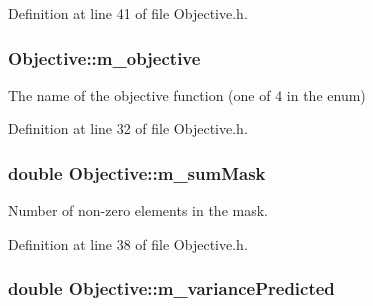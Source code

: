 Definition at line 41 of file Objective.\+h.

\subsubsection[{\texorpdfstring{m\+\_\+objective}{m_objective}}]{ Objective\+::m\+\_\+objective\hspace{0.3cm}{\ttfamily [private]}}\hypertarget{classObjective_a51987f37a05068aba28866a967eb4e67}{}\label{classObjective_a51987f37a05068aba28866a967eb4e67}


The name of the objective function (one of 4 in the enum) 



Definition at line 32 of file Objective.\+h.

\subsubsection[{\texorpdfstring{m\+\_\+sum\+Mask}{m_sumMask}}]{\setlength{\rightskip}{0pt plus 5cm}double Objective\+::m\+\_\+sum\+Mask\hspace{0.3cm}{\ttfamily [private]}}\hypertarget{classObjective_a64f93d50b1443c29b50dfb7b451b62d1}{}\label{classObjective_a64f93d50b1443c29b50dfb7b451b62d1}


Number of non-\/zero elements in the mask. 



Definition at line 38 of file Objective.\+h.

\subsubsection[{\texorpdfstring{m\+\_\+variance\+Predicted}{m_variancePredicted}}]{\setlength{\rightskip}{0pt plus 5cm}double Objective\+::m\+\_\+variance\+Predicted\hspace{0.3cm}{\ttfamily [private]}}\hypertarget{classObjective_a82366bcac1547f5709b6452d168d3e16}{}\label{classObjective_a82366bcac1547f5709b6452d168d3e16}


